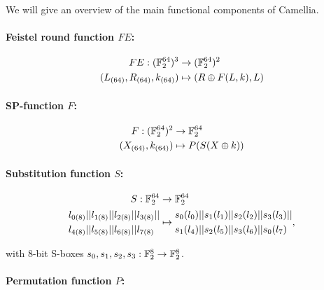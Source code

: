 We will give an overview of the main functional components of Camellia.

\paragraph{Feistel round function $FE$:}

\begin{align*}
    FE:(\mathbb{F}_2^{64})^3 &\rightarrow (\mathbb{F}_2^{64})^2 \\
    (L_{(64)},R_{(64)},k_{(64)})&\mapsto (R\oplus F(L,k), L)
\end{align*}

\paragraph{SP-function $F$:}

\begin{align*}
    F:(\mathbb{F}_2^{64})^2 &\rightarrow \mathbb{F}_2^{64} \\
    (X_{(64)},k_{(64)})&\mapsto P(S(X\oplus k))
\end{align*}

\paragraph{Substitution function $S$:}

\begin{align*}
    S:\mathbb{F}_2^{64} &\rightarrow \mathbb{F}_2^{64} \\
    \begin{aligned}
        l_{0(8)}||l_{1(8)}||l_{2(8)}||l_{3(8)}&||\\
        l_{4(8)}||l_{5(8)}||l_{6(8)}||l_{7(8)}&
    \end{aligned}&\mapsto
    \begin{aligned}
        s_0(l_0)||s_1(l_1)||s_2(l_2)||s_3(l_3)&||\\
        s_1(l_4)||s_2(l_5)||s_3(l_6)||s_0(l_7)&
    \end{aligned},
\end{align*}

with 8-bit S-boxes $s_0,s_1,s_2,s_3:\mathbb{F}_2^{8}\rightarrow \mathbb{F}_2^{8}$.

\paragraph{Permutation function $P$:}

